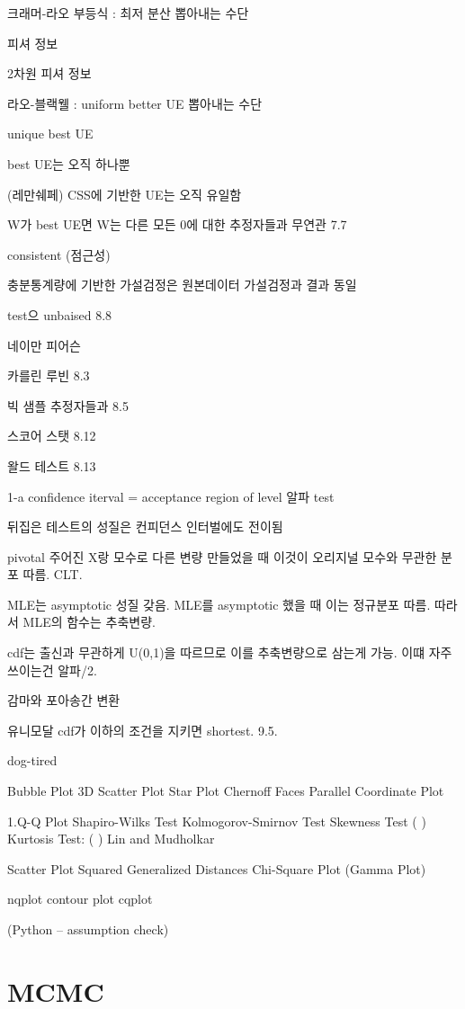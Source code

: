\documentclass[
]{book}
\begin{document}
크래머-라오 부등식 : 최저 분산 뽑아내는 수단

피셔 정보

2차원 피셔 정보

라오-블랙웰 : uniform better UE 뽑아내는 수단

unique best UE

best UE는 오직 하나뿐

(레만쉐페) CSS에 기반한 UE는 오직 유일함

W가 best UE면 W는 다른 모든 0에 대한 추정자들과 무연관 7.7

consistent (점근성)

충분통계량에 기반한 가설검정은 원본데이터 가설검정과 결과 동일

test으 unbaised 8.8

네이만 피어슨

카를린 루빈 8.3

빅 샘플 추정자들과 8.5

스코어 스탯 8.12

왈드 테스트 8.13

1-a confidence iterval = acceptance region of level 알파 test

뒤집은 테스트의 성질은 컨피던스 인터벌에도 전이됨

pivotal 주어진 X랑 모수로 다른 변량 만들었을 때 이것이 오리지널 모수와 무관한 분포 따름. CLT.

MLE는 asymptotic 성질 갖음. MLE를 asymptotic 했을 때 이는 정규분포 따름. 따라서 MLE의 함수는 추축변량.

cdf는 출신과 무관하게 U(0,1)을 따르므로 이를 추축변량으로 삼는게 가능. 이떄 자주 쓰이는건 알파/2.

감마와 포아송간 변환

유니모달 cdf가 이하의 조건을 지키면 shortest. 9.5.

dog-tired

Bubble Plot
3D Scatter Plot
Star Plot
Chernoff Faces
Parallel Coordinate Plot

1.Q-Q Plot
Shapiro-Wilks Test
Kolmogorov-Smirnov Test
Skewness Test ( )
Kurtosis Test: ( )
Lin and Mudholkar

Scatter Plot
Squared Generalized Distances
Chi-Square Plot (Gamma Plot)

nqplot
contour plot
cqplot

(Python -- assumption check)

\hypertarget{mcmc}{%
\chapter{MCMC}\label{mcmc}}
\end{document}
